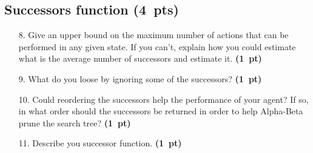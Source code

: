 \documentclass[11pt,a4paper]{report}
\begin{document}
\begin{answers}[20cm]
\end{answers}






\clearpage
\subsection{Successors function (4~pts)}

\begin{enumerate}
\item[8.] Give an upper bound on the maximum number of actions that can be performed in
any given state. If you can't, explain how you could estimate what is the average
number of successors and estimate it. \textbf{(1~pt)}
\end{enumerate}

\begin{answers}[9cm]
\end{answers}






\begin{enumerate}
\item[9.] What do you loose by ignoring some of the successors? \textbf{(1~pt)}
\end{enumerate}

\begin{answers}[9cm]
\end{answers}






\begin{enumerate}
\item[10.] Could reordering the successors help the performance of your agent? If so, in what order should the successors be returned in order to help Alpha-Beta
prune the search tree? \textbf{(1~pt)}
\end{enumerate}

\begin{answers}[9cm]
\end{answers}





\begin{enumerate}
\item[11.] Describe you successor function. \textbf{(1~pt)}
\end{enumerate}
\end{document}
